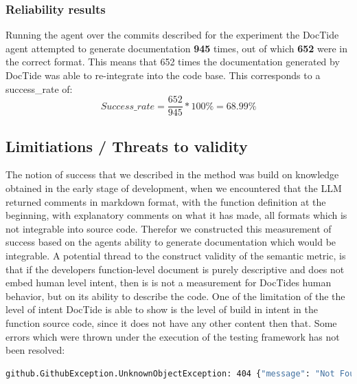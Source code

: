 \subsubsection{Reliability results}
\label{sec:suc_results}
Running the agent over the commits described for the experiment the DocTide agent attempted to generate documentation \textbf{945} times, out of which \textbf{652} were in the correct format. This means that 652 times the documentation generated by DocTide was able to re-integrate into the code base. This corresponds to a success\_rate of:
\[
Success\_rate=\frac{652}{945}*100\% = 68.99\%
\]

\subsection{Limitiations / Threats to validity}
The notion of success that we described in the method  was build on knowledge obtained in the early stage of development, when we encountered that the LLM returned comments in markdown format, with the function definition at the beginning, with explanatory comments on what it has made, all formats which is not integrable into source code. Therefor we constructed this measurement of success based on the agents ability to generate documentation which would be integrable.
A potential thread to the construct validity of the semantic metric, is that if the developers function-level document is purely descriptive and does not embed human level intent, then is is not a measurement for DocTides human behavior, but on its ability to describe the code. One of the limitation of the the level of intent DocTide is able to show is the level of build in intent in the function source code, since it does not have any other content then that. Some errors which were thrown under the execution of the testing framework has not been resolved:
\begin{lstlisting}[language=bash, label={lst:unresolved_errors}, caption=Unresloved errors ]
    github.GithubException.UnknownObjectException: 404 {"message": "Not Found", "documentation_url": "https://docs.github.com/rest/repos/contents#get-repository-content", "status": "404"}
\end{lstlisting}

